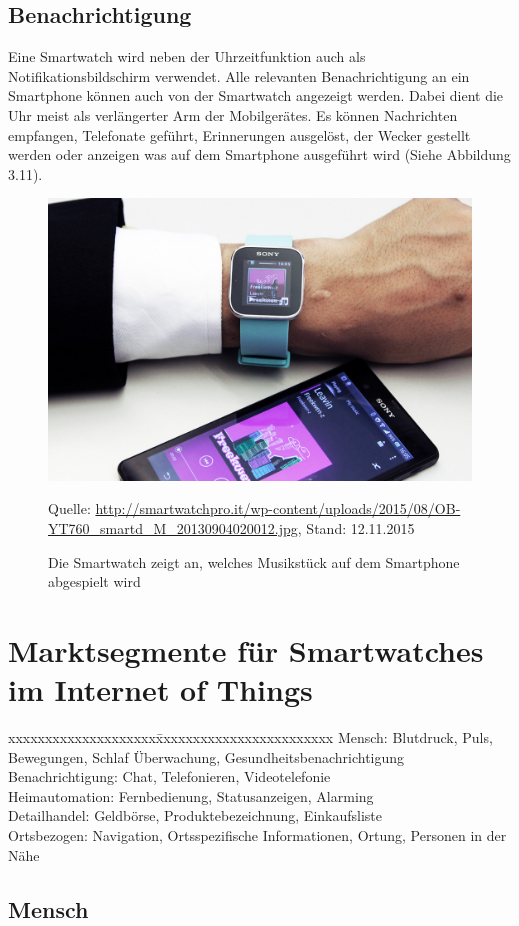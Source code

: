\subsection{Benachrichtigung}
Eine Smartwatch wird neben der Uhrzeitfunktion auch als Notifikationsbildschirm verwendet. Alle relevanten Benachrichtigung an ein Smartphone können auch von der Smartwatch angezeigt werden. Dabei dient die Uhr meist als verlängerter Arm der Mobilgerätes. Es können Nachrichten empfangen, Telefonate geführt, Erinnerungen ausgelöst, der Wecker gestellt werden oder anzeigen was auf dem Smartphone ausgeführt wird (Siehe Abbildung 3.11).
\begin{figure}[H]
  \centering
  \includegraphics[scale=0.38]{98_Bilder/03_Marktsegmente/notifications}
  \caption[Smartwatch Anzeige von Smartphone]{Die Smartwatch zeigt an, welches Musikstück auf dem Smartphone abgespielt wird}
  \footnotesize Quelle: \url{http://smartwatchpro.it/wp-content/uploads/2015/08/OB-YT760_smartd_M_20130904020012.jpg}, Stand: 12.11.2015
\end{figure}
\newpage

\section{Marktsegmente für Smartwatches im Internet of Things}
\begin{tabbing}
xxxxxxxxxxxxxxxxxxxx\=xxxxxxxxxxxxxxxxxxxxxxxx	\kill
Mensch:		        \> Blutdruck, Puls, Bewegungen, Schlaf Überwachung, Gesundheitsbenachrichtigung \\
Benachrichtigung:	\> Chat, Telefonieren, Videotelefonie \\
Heimautomation:	  \> Fernbedienung, Statusanzeigen, Alarming \\
Detailhandel:		  \> Geldbörse, Produktebezeichnung, Einkaufsliste \\
Ortsbezogen:		  \> Navigation, Ortsspezifische Informationen, Ortung, Personen in der Nähe \\
\end{tabbing}

\subsection{Mensch}
